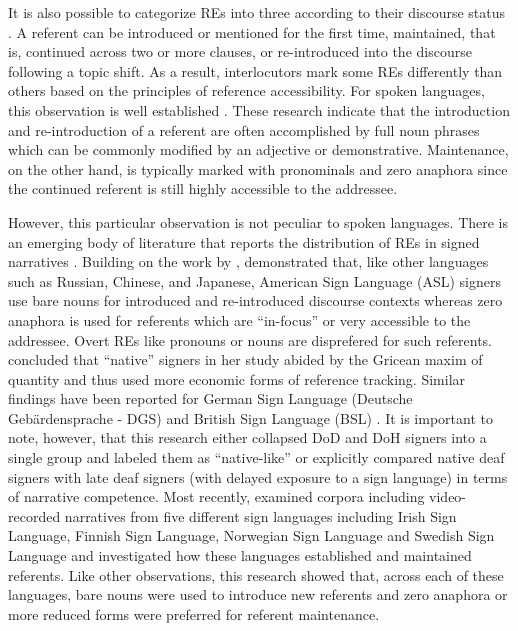 \documentclass[review]{elsarticle} %
\begin{document}
It is also possible to categorize REs into three according to their
discourse status \citep{gullberg2006}. A referent can be introduced or
mentioned for the first time, maintained, that is, continued across two
or more clauses, or re-introduced into the discourse following a topic
shift. As a result, interlocutors mark some REs differently than others
based on the principles of reference accessibility. For spoken
languages, this observation is well established
\citep{ariel1990, givon1983, gundel1993, debreslioska2013, ahrenholz2005, chafe1976, hickmann1996, azar2015}.
These research indicate that the introduction and re-introduction of a
referent are often accomplished by full noun phrases which can be
commonly modified by an adjective or demonstrative. Maintenance, on the
other hand, is typically marked with pronominals and zero anaphora since
the continued referent is still highly accessible to the addressee.

However, this particular observation is not peculiar to spoken
languages. There is an emerging body of literature that reports the
distribution of REs in signed narratives
\citep{czubek2017, ferrara2022, swabey2002, frederiksen2016, perniss2015, morgan2005, hodge2019, ahlgren1994, garcia_reference_2014, garcia2018impersonal}.
Building on the work by \citet{gundel1993}, \citet{swabey2002}
demonstrated that, like other languages such as Russian, Chinese, and
Japanese, American Sign Language (ASL) signers use bare nouns for
introduced and re-introduced discourse contexts whereas zero anaphora is
used for referents which are ``in-focus'' or very accessible to the
addressee. Overt REs like pronouns or nouns are disprefered for such
referents. \citet{swabey2002} concluded that ``native'' signers in her
study abided by the Gricean maxim of quantity and thus used more
economic forms of reference tracking. Similar findings have been
reported for German Sign Language (Deutsche Gebärdensprache - DGS)
\citep{perniss2015} and British Sign Language (BSL) \citep{morgan2005}.
It is important to note, however, that this research either collapsed
DoD and DoH signers into a single group and labeled them as
``native-like'' or explicitly compared native deaf signers with late
deaf signers (with delayed exposure to a sign language) in terms of
narrative competence. Most recently, \citet{ferrara2022} examined
corpora including video-recorded narratives from five different sign
languages including Irish Sign Language, Finnish Sign Language,
Norwegian Sign Language and Swedish Sign Language and investigated how
these languages established and maintained referents. Like other
observations, this research showed that, across each of these languages,
bare nouns were used to introduce new referents and zero anaphora or
more reduced forms were preferred for referent maintenance.
\end{document}
